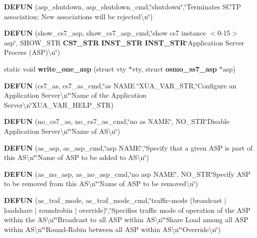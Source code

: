\begin{DoxyCompactItemize}
{\bf D\+E\+F\+UN} (asp\+\_\+shutdown, asp\+\_\+shutdown\+\_\+cmd,\char`\"{}shutdown\char`\"{},\char`\"{}Terminates S\+C\+TP association; New associations will be rejected\textbackslash{}n\char`\"{})
\item 
{\bf D\+E\+F\+UN} (show\+\_\+cs7\+\_\+asp, show\+\_\+cs7\+\_\+asp\+\_\+cmd,\char`\"{}show cs7 instance $<$0-\/15$>$ asp\char`\"{}, S\+H\+O\+W\+\_\+\+S\+TR {\bf C\+S7\+\_\+\+S\+TR} {\bf I\+N\+S\+T\+\_\+\+S\+TR} {\bf I\+N\+S\+T\+\_\+\+S\+TR}\char`\"{}Application Server Process (A\+SP)\textbackslash{}n\char`\"{})
\item 
static void {\bf write\+\_\+one\+\_\+asp} (struct vty $\ast$vty, struct {\bf osmo\+\_\+ss7\+\_\+asp} $\ast$asp)
\item 
{\bf D\+E\+F\+UN} (cs7\+\_\+as, cs7\+\_\+as\+\_\+cmd,\char`\"{}as N\+A\+ME \char`\"{}X\+U\+A\+\_\+\+V\+A\+R\+\_\+\+S\+TR,\char`\"{}Configure an Application Server\textbackslash{}n\char`\"{}\char`\"{}Name of the Application Server\textbackslash{}n\char`\"{}X\+U\+A\+\_\+\+V\+A\+R\+\_\+\+H\+E\+L\+P\+\_\+\+S\+TR)
\item 
{\bf D\+E\+F\+UN} (no\+\_\+cs7\+\_\+as, no\+\_\+cs7\+\_\+as\+\_\+cmd,\char`\"{}no as N\+A\+ME\char`\"{}, N\+O\+\_\+\+S\+TR\char`\"{}Disable Application Server\textbackslash{}n\char`\"{}\char`\"{}Name of A\+S\textbackslash{}n\char`\"{})
\item 
{\bf D\+E\+F\+UN} (as\+\_\+asp, as\+\_\+asp\+\_\+cmd,\char`\"{}asp N\+A\+ME\char`\"{},\char`\"{}Specify that a given A\+SP is part of this A\+S\textbackslash{}n\char`\"{}\char`\"{}Name of A\+SP to be added to A\+S\textbackslash{}n\char`\"{})
\item 
{\bf D\+E\+F\+UN} (as\+\_\+no\+\_\+asp, as\+\_\+no\+\_\+asp\+\_\+cmd,\char`\"{}no asp N\+A\+ME\char`\"{}, N\+O\+\_\+\+S\+TR\char`\"{}Specify A\+SP to be removed from this A\+S\textbackslash{}n\char`\"{}\char`\"{}Name of A\+SP to be removed\textbackslash{}n\char`\"{})
\item 
{\bf D\+E\+F\+UN} (as\+\_\+traf\+\_\+mode, as\+\_\+traf\+\_\+mode\+\_\+cmd,\char`\"{}traffic-\/mode (broadcast $\vert$ loadshare $\vert$ roundrobin $\vert$ override)\char`\"{},\char`\"{}Specifies traffic mode of operation of the A\+SP within the A\+S\textbackslash{}n\char`\"{}\char`\"{}Broadcast to all A\+SP within A\+S\textbackslash{}n\char`\"{}\char`\"{}Share Load among all A\+SP within A\+S\textbackslash{}n\char`\"{}\char`\"{}Round-\/Robin between all A\+SP within A\+S\textbackslash{}n\char`\"{}\char`\"{}Override\textbackslash{}n\char`\"{})
\item 

\end{DoxyCompactItemize}
